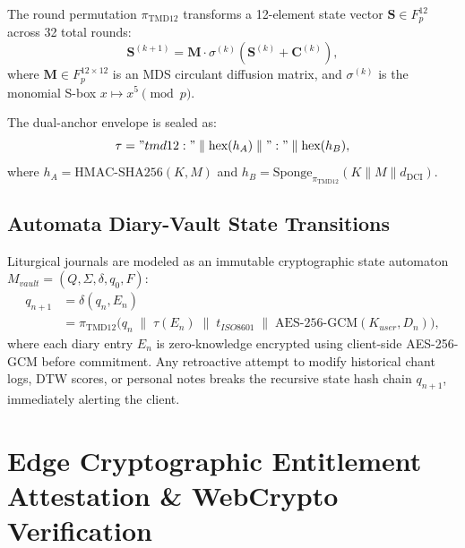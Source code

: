 \documentclass[11pt,a4paper,reqno]{article}
\def\texttt#1{#1}%
\def\mathrm#1{#1}%
\def\mathcal#1{#1}%
\def\mathbb#1{#1}%
\theoremstyle{plain}
\theoremstyle{definition}
\theoremstyle{remark}
\numberwithin{equation}{section}
\begin{document}
The round permutation $\pi_{\text{TMD12}}$ transforms a 12-element state vector $\mathbf{S} \in \mathbb{F}_p^{12}$ across 32 total rounds:
\begin{equation}
\label{eq:tmd12_round}
\mathbf{S}^{(k+1)} = \mathbf{M} \cdot \sigma^{(k)}\left(\mathbf{S}^{(k)} + \mathbf{C}^{(k)}\right),
\end{equation}
where $\mathbf{M} \in \mathbb{F}_p^{12 \times 12}$ is an MDS circulant diffusion matrix, and $\sigma^{(k)}$ is the monomial S-box $x \mapsto x^5 \pmod p$.

The dual-anchor envelope is sealed as:
\begin{equation}
\label{eq:diary_envelope}
\tau = \texttt{"tmd12:"} \parallel \text{hex}(h_A) \parallel \texttt{":"} \parallel \text{hex}(h_B),
\end{equation}
where $h_A = \text{HMAC-SHA256}(\mathcal{K}, \mathcal{M})$ and $h_B = \text{Sponge}_{\pi_{\text{TMD12}}}(\mathcal{K} \parallel \mathcal{M} \parallel d_{\text{DCI}})$.

\subsection{\texorpdfstring{Automata Diary-Vault State Transitions}{Automata Diary-Vault State Transitions}}
Liturgical journals are modeled as an immutable cryptographic state automaton $\mathcal{M}_{\mathrm{vault}} = (\mathcal{Q}, \Sigma, \delta, q_0, \mathcal{F})$:
\begin{equation}
\label{eq:automata_transition_v12}
\begin{aligned}
q_{n+1} &= \delta(q_n, \mathcal{E}_n) \\
&= \pi_{\text{TMD12}}\Big( q_n \;\parallel\; \tau(\mathcal{E}_n) \;\parallel\; t_{\mathrm{ISO8601}} \;\parallel\; \text{AES-256-GCM}(\mathcal{K}_{\mathrm{user}}, \mathcal{D}_n) \Big),
\end{aligned}
\end{equation}
where each diary entry $\mathcal{E}_n$ is zero-knowledge encrypted using client-side AES-256-GCM before commitment. Any retroactive attempt to modify historical chant logs, DTW scores, or personal notes breaks the recursive state hash chain $q_{n+1}$, immediately alerting the client.

\section{\texorpdfstring{Edge Cryptographic Entitlement Attestation \& WebCrypto Verification}{Edge Cryptographic Entitlement Attestation and WebCrypto Verification}}
\label{sec:entitlement}
\end{document}

